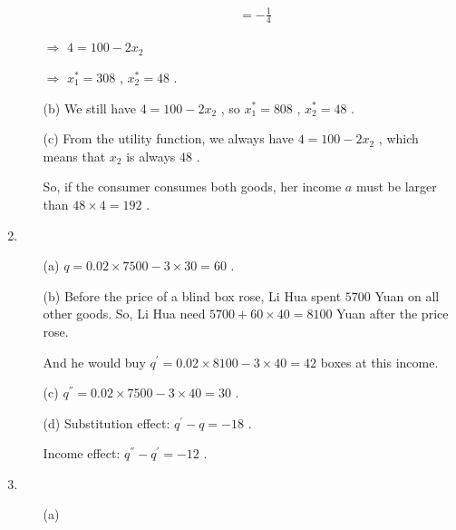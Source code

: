\documentclass{article}
\begin{document}
\begin{enumerate}
\begin{enumerate}
\begin{equation}
\begin{aligned}
                &=-\frac{1}{4}
            \end{aligned}
            \nonumber
        \end{equation} \par
        $\Rightarrow$ $4=100-2x_2$ \par
        $\Rightarrow$ $x_1^*=308$ , $x_2^*=48$ .
        \item[(b)] We still have $4=100-2x_2$ , so $x_1^*=808$ , $x_2^*=48$ .
        \item[(c)] From the utility function, we always have $4=100-2x_2$ , which means that $x_2$ is always $48$ . \par
        So, if the consumer consumes both goods, her income $a$ must be larger than $48\times4=192$ . \par
    \end{enumerate}
    \item \begin{enumerate}
        \item[(a)] $q=0.02\times7500-3\times30=60$ .
        \item[(b)] Before the price of a blind box rose, Li Hua spent $5700$ Yuan on all other goods.
        So, Li Hua need $5700+60\times40=8100$ Yuan after the price rose. \par
        And he would buy $q^{'}=0.02\times8100-3\times40=42$ boxes at this income.
        \item[(c)] $q^{''}=0.02\times7500-3\times40=30$ .
        \item[(d)] Substitution effect: $q^{'}-q=-18$ . \par
        Income effect: $q^{''}-q^{'}=-12$ .
    \end{enumerate}
    \item \begin{enumerate}
        \item[(a)] \leavevmode\vadjust{\vspace{-\baselineskip}}\newline
        \begin{figure}[!htb]
            \centering
\end{figure}
\end{enumerate}
\end{enumerate}
\end{document}
